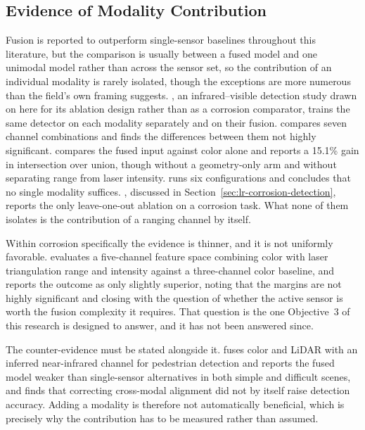 \subsection{Evidence of Modality Contribution}

Fusion is reported to outperform single-sensor baselines throughout this
literature, but the comparison is usually between a fused model and one
unimodal model rather than across the sensor set, so the contribution of an
individual modality is rarely isolated, though the exceptions are more numerous
than the field's own framing suggests. \citet{Hou2024}, an infrared--visible
detection study drawn on here for its ablation design rather than as a corrosion
comparator, trains the same detector on each modality separately and on their
fusion. \citet{Haitz2022} compares
seven channel combinations and finds the differences between them not highly
significant. \citet{Maru2025} compares the fused input against color alone and
reports a 15.1\% gain in intersection over union, though without a
geometry-only arm and without separating range from laser intensity.
\citet{Rashidi2026} runs six configurations and concludes that no single
modality suffices. \citet{Ding2025}, discussed in
Section~\ref{sec:lr-corrosion-detection}, reports the only leave-one-out
ablation on a corrosion task. What none of them isolates is the contribution of
a ranging channel by itself.

Within corrosion specifically the evidence is thinner, and it is not uniformly
favorable. \citet{Haitz2022} evaluates a five-channel feature space combining
color with laser triangulation range and intensity against a three-channel color
baseline, and reports the outcome as only slightly superior, noting that the
margins are not highly significant and closing with the question of whether the
active sensor is worth the fusion complexity it requires. That question is the
one Objective~3 of this research is designed to answer, and it has not been
answered since.

The counter-evidence must be stated alongside it. \citet{Wu2025} fuses color and
LiDAR with an inferred near-infrared channel for pedestrian detection and reports
the fused model weaker than single-sensor alternatives in both simple and
difficult scenes, and \citet{Liu2025} finds that correcting cross-modal
alignment did not by itself raise detection accuracy. Adding a modality is
therefore not automatically beneficial, which is precisely why the contribution
has to be measured rather than assumed.

